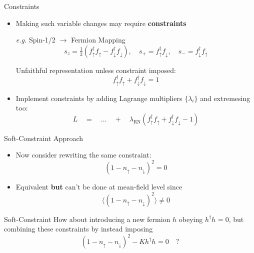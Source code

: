 \documentclass[13pt]{beamer}
\begin{document}
  \begin{frame}{Constraints}

  \begin{itemize}
    \item Making such variable changes may require \textbf{constraints}
  

  \begin{exampleblock}{\textit{e.g.} Spin-1/2 $ \rightarrow $ Fermion Mapping}
  $$ s_z = \tfrac{1}{2} (f^{\dagger}_{\uparrow} f^{}_{\uparrow} - f^{\dagger}_{\downarrow} f^{}_{\downarrow}), \quad s_{+} = f^{\dagger}_{\uparrow} f^{}_{\downarrow}, \quad s_{-} = f^{\dagger}_{\downarrow} f^{}_{\uparrow} $$

  Unfaithful representation unless constraint imposed: $$ f^{\dagger}_{\uparrow} f^{}_{\uparrow} + f^{\dagger}_{\downarrow} f^{}_{\downarrow} = 1 $$
  \end{exampleblock}

    \item Implement constraints by adding Lagrange multipliers $ \{ \lambda_i \}$ and extremesing too: $$ L \quad = \quad \ldots \quad + \quad \lambda_{\text{RN}} (f^{\dagger}_{\uparrow} f^{}_{\uparrow} + f^{\dagger}_{\downarrow} f^{}_{\downarrow} - 1) $$

  \end{itemize}
  \end{frame}

  \begin{frame}{Soft-Constraint Approach}

  \begin{itemize}
    \item Now consider rewriting the same constraint: $$ (1 - n_{\uparrow} - n_{\downarrow})^2 = 0 $$
    \item Equivalent \textbf{but} can't be done at mean-field level since $$ \langle (1 - n_{\uparrow} - n_{\downarrow})^2 \rangle \neq 0 $$

    \end{itemize}

    \begin{block}{Soft-Constraint}
      How about introducing a new fermion $ h $ obeying $ h^{\dagger} h^{} = 0 $, but combining these constraints by instead imposing $$ (1 - n_{\uparrow} - n_{\downarrow})^2 - K h^{\dagger} h^{} = 0 \quad ? $$
    \end{block}

  \end{frame}
\end{document}
